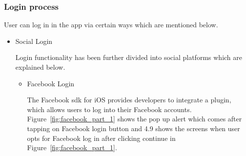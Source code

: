 \subsubsection{Login process}

User can log in in the app via certain ways which are mentioned below.

\begin{itemize}
    \item Social Login
    
    Login functionality has been further divided into social platforms which are explained below.
    
    \begin{itemize}
        \item Facebook Login
        
       The Facebook \gls{sdk} for \gls{iOS} provides developers to integrate a plugin, which allows users to log into their Facebook accounts. Figure~\ref{fig:facebook_part_1} shows the pop up alert which comes after tapping on Facebook login button and 4.9 shows the screens when user opts for Facebook log in after clicking continue in Figure~\ref{fig:facebook_part_1}.
       

\end{itemize}
\end{itemize}
